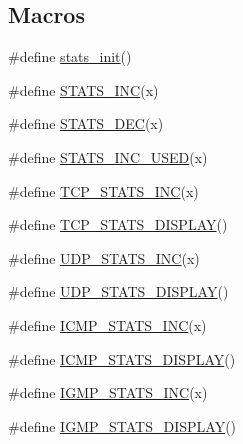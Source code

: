 \subsection*{Macros}
\begin{DoxyCompactItemize}
\item 
\#define \hyperlink{openmote-cc2538_2lwip_2src_2include_2lwip_2stats_8h_a832291112716a16838a0cc49595211b2}{stats\+\_\+init}()
\item 
\#define \hyperlink{openmote-cc2538_2lwip_2src_2include_2lwip_2stats_8h_a4c429f98c739943e03372340aa66cdd1}{S\+T\+A\+T\+S\+\_\+\+I\+NC}(x)
\item 
\#define \hyperlink{openmote-cc2538_2lwip_2src_2include_2lwip_2stats_8h_a24268eb825e8d4821224b9615f9d7c26}{S\+T\+A\+T\+S\+\_\+\+D\+EC}(x)
\item 
\#define \hyperlink{openmote-cc2538_2lwip_2src_2include_2lwip_2stats_8h_ab0f8725b21324cfed9ea8802841cdbc5}{S\+T\+A\+T\+S\+\_\+\+I\+N\+C\+\_\+\+U\+S\+ED}(x)
\item 
\#define \hyperlink{openmote-cc2538_2lwip_2src_2include_2lwip_2stats_8h_a33fdaa705af04fb9a82f1cf0ba21091d}{T\+C\+P\+\_\+\+S\+T\+A\+T\+S\+\_\+\+I\+NC}(x)
\item 
\#define \hyperlink{openmote-cc2538_2lwip_2src_2include_2lwip_2stats_8h_a4e99d88049a4180c07076df710a75b32}{T\+C\+P\+\_\+\+S\+T\+A\+T\+S\+\_\+\+D\+I\+S\+P\+L\+AY}()
\item 
\#define \hyperlink{openmote-cc2538_2lwip_2src_2include_2lwip_2stats_8h_acfc9de2d6edadfa3de3d9dfeb48f76b2}{U\+D\+P\+\_\+\+S\+T\+A\+T\+S\+\_\+\+I\+NC}(x)
\item 
\#define \hyperlink{openmote-cc2538_2lwip_2src_2include_2lwip_2stats_8h_aaddc6f77df5f9381ddf4c51f2f4eec65}{U\+D\+P\+\_\+\+S\+T\+A\+T\+S\+\_\+\+D\+I\+S\+P\+L\+AY}()
\item 
\#define \hyperlink{openmote-cc2538_2lwip_2src_2include_2lwip_2stats_8h_ab885363b29506cb4b68d891f5a056e55}{I\+C\+M\+P\+\_\+\+S\+T\+A\+T\+S\+\_\+\+I\+NC}(x)
\item 
\#define \hyperlink{openmote-cc2538_2lwip_2src_2include_2lwip_2stats_8h_a87488399aba1ae313ec48a782d1710d0}{I\+C\+M\+P\+\_\+\+S\+T\+A\+T\+S\+\_\+\+D\+I\+S\+P\+L\+AY}()
\item 
\#define \hyperlink{openmote-cc2538_2lwip_2src_2include_2lwip_2stats_8h_ad4ddb71a8ddf444971069c1569f0cd03}{I\+G\+M\+P\+\_\+\+S\+T\+A\+T\+S\+\_\+\+I\+NC}(x)
\item 
\#define \hyperlink{openmote-cc2538_2lwip_2src_2include_2lwip_2stats_8h_a8ed6ad7a8d32d6738da2f95a9873b1cb}{I\+G\+M\+P\+\_\+\+S\+T\+A\+T\+S\+\_\+\+D\+I\+S\+P\+L\+AY}()

\end{DoxyCompactItemize}
